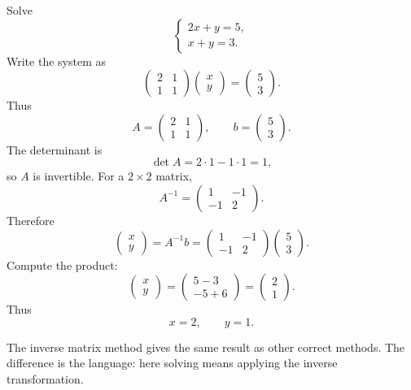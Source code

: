 \begin{examplebox}
Solve
\[
\begin{cases}
2x+y=5,\\
x+y=3.
\end{cases}
\]
Write the system as
\[
\begin{pmatrix}
2&1\\
1&1
\end{pmatrix}
\begin{pmatrix}
x\\y
\end{pmatrix}
=
\begin{pmatrix}
5\\3
\end{pmatrix}.
\]
Thus
\[
A=\begin{pmatrix}2&1\\1&1\end{pmatrix},
\qquad
b=\begin{pmatrix}5\\3\end{pmatrix}.
\]
The determinant is
\[
\det A=2\cdot1-1\cdot1=1,
\]
so \(A\) is invertible. For a \(2\times2\) matrix,
\[
A^{-1}=\begin{pmatrix}1&-1\\-1&2\end{pmatrix}.
\]
Therefore
\[
\begin{pmatrix}x\\y\end{pmatrix}
=A^{-1}b
=
\begin{pmatrix}1&-1\\-1&2\end{pmatrix}
\begin{pmatrix}5\\3\end{pmatrix}.
\]
Compute the product:
\[
\begin{pmatrix}x\\y\end{pmatrix}
=
\begin{pmatrix}5-3\\-5+6\end{pmatrix}
=
\begin{pmatrix}2\\1\end{pmatrix}.
\]
Thus
\[
x=2,
\qquad
 y=1.
\]
\end{examplebox}

The inverse matrix method gives the same result as other correct methods. The difference is the language: here solving means applying the inverse transformation.

